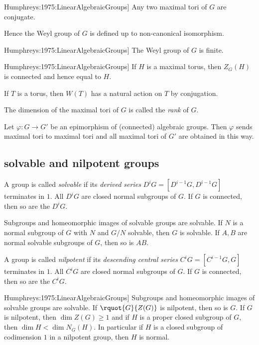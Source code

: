 \documentclass[english, no-theorem-numbers]{short-notes}
\newcommand\Humph[1]{\cite[#1]{Humphreys:1975:LinearAlgebraicGroups}}
\begin{document}
\begin{Thm}[\Humph{Cor.~21.3A}]
    Any two maximal tori of $G$ are conjugate.
\end{Thm}

Hence the Weyl group of $G$ is defined up to non-canonical isomorphism.

\begin{Prop}[\Humph{Prop.~24.1A}]
    The Weyl group of $G$ is finite.
\end{Prop}

\begin{Thm}[\Humph{Thm.~22.3}]
    If $H$ is a maximal torus, then $Z_G(H)$ is connected and hence equal to $H$.
\end{Thm}

If $T$ is a torus, then $W(T)$ has a natural action on $T$ by conjugation.

\begin{Def}
    The dimension of the maximal tori of $G$ is called the \emph{rank} of $G$.
\end{Def}

\begin{Prop}
    Let $φ\colon G → G'$ be an epimorphism of (connected) algebraic groups.
    Then $φ$ sends maximal tori to maximal tori and all maximal tori of $G'$ are obtained in this way.
\end{Prop}

\subsection*{solvable and nilpotent groups}

A group is called \emph{solvable} if its \emph{derived series} $D^{i}G = [D^{i-1}G,D^{i-1}G]$ terminates in $1$.
All $D^iG$ are closed normal subgroups of $G$. 
If $G$ is connected, then so are the $D^iG$.

\begin{Lem}
    Subgroups and homeomorphic images of solvable groups are solvable.
    If $N$ is a normal subgroup of $G$ with $N$ and $G/N$ solvable, then $G$ is solvable.
    If $A, B$ are normal solvable subgroups of $G$, then so is $AB$.
\end{Lem}

A group is called \emph{nilpotent} if its \emph{descending central series} $C^{i}G = [C^{i-1}G,G]$ terminates in $1$.
All $C^iG$ are closed normal subgroups of $G$. 
If $G$ is connected, then so are the $C^iG$.

\begin{Lem}[\Humph{Prop.~17.4}]
    Subgroups and homeomorphic images of solvable groups are solvable.
    If $\rquot{G}{Z(G)}$ is nilpotent, then so is $G$.
    If $G$ is nilpotent, then $\dim Z(G) \ge 1$ and if $H$ is a proper closed subgroup of $G$, then $\dim H < \dim N_G(H)$.
    In particular if $H$ is a closed subgroup of codimension $1$ in a nilpotent group, then $H$ is normal.
\end{Lem}
\end{document}
